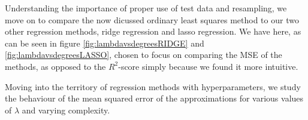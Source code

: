 Understanding the importance of proper use of test data and resampling, we move on to compare the now dicussed ordinary least squares method to our two other regression methods, ridge regression and lasso regression. We have here, as can be seen in figure \ref{fig:lambdavsdegreesRIDGE} and \ref{fig:lambdavsdegreesLASSO}, chosen to focus on comparing the MSE of the methods, as opposed to the $R^2$-score simply because we found it more intuitive.

Moving into the territory of regression methods with hyperparameters, we study the behaviour of the mean squared error of the approximations for various values of $\lambda$ and varying complexity.

